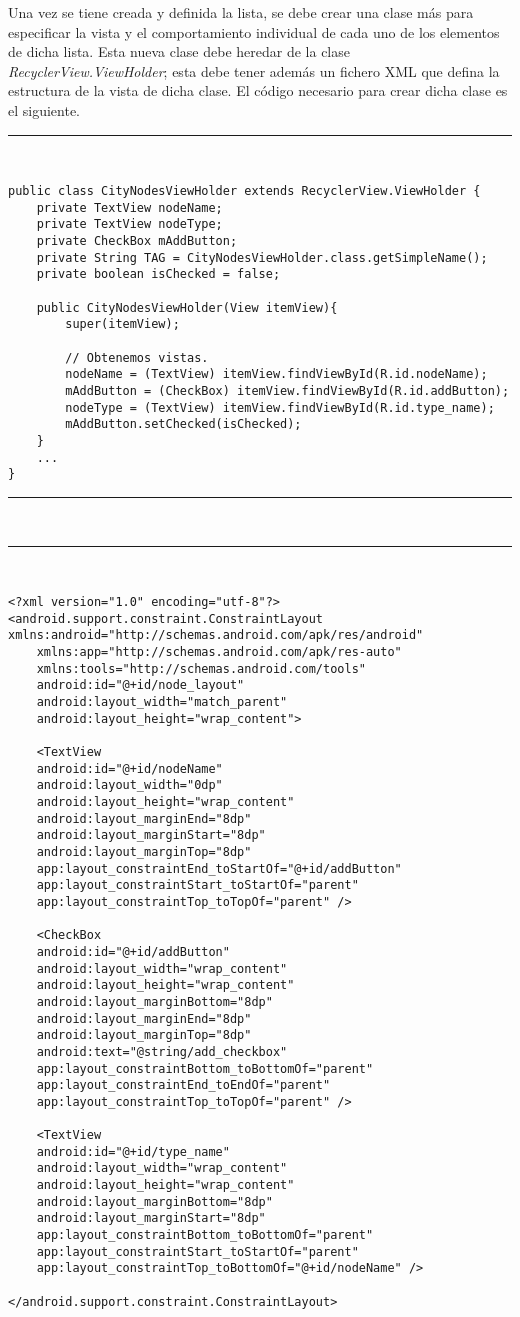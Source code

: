 Una vez se tiene  creada y definida la lista, se debe crear una clase más para especificar la vista y el comportamiento individual de cada uno de los elementos de dicha lista. Esta nueva clase debe heredar de la clase \textit{RecyclerView.ViewHolder}; esta debe tener además un fichero XML que defina la estructura de la vista de dicha clase. El código necesario para crear dicha clase es el siguiente.\newline

\noindent\rule[-1ex]{\textwidth}{1pt}\\
\begin{lstlisting}[caption=Código para crear un elemento de una lista en Android.]
public class CityNodesViewHolder extends RecyclerView.ViewHolder {
	private TextView nodeName;
	private TextView nodeType;
	private CheckBox mAddButton;
	private String TAG = CityNodesViewHolder.class.getSimpleName();
	private boolean isChecked = false;
	
	public CityNodesViewHolder(View itemView){
		super(itemView);
		
		// Obtenemos vistas.
		nodeName = (TextView) itemView.findViewById(R.id.nodeName);
		mAddButton = (CheckBox) itemView.findViewById(R.id.addButton);
		nodeType = (TextView) itemView.findViewById(R.id.type_name);
		mAddButton.setChecked(isChecked);
	}
	...
}
\end{lstlisting}
\noindent\rule[-1ex]{\textwidth}{1pt}\\
\newpage
\noindent\rule[-1ex]{\textwidth}{1pt}\\
\begin{lstlisting}[caption=Código XML de la vista de un elemento de la lista.]
<?xml version="1.0" encoding="utf-8"?>
<android.support.constraint.ConstraintLayout xmlns:android="http://schemas.android.com/apk/res/android"
	xmlns:app="http://schemas.android.com/apk/res-auto"
	xmlns:tools="http://schemas.android.com/tools"
	android:id="@+id/node_layout"
	android:layout_width="match_parent"
	android:layout_height="wrap_content">

	<TextView
	android:id="@+id/nodeName"
	android:layout_width="0dp"
	android:layout_height="wrap_content"
	android:layout_marginEnd="8dp"
	android:layout_marginStart="8dp"
	android:layout_marginTop="8dp"
	app:layout_constraintEnd_toStartOf="@+id/addButton"
	app:layout_constraintStart_toStartOf="parent"
	app:layout_constraintTop_toTopOf="parent" />
	
	<CheckBox
	android:id="@+id/addButton"
	android:layout_width="wrap_content"
	android:layout_height="wrap_content"
	android:layout_marginBottom="8dp"
	android:layout_marginEnd="8dp"
	android:layout_marginTop="8dp"
	android:text="@string/add_checkbox"
	app:layout_constraintBottom_toBottomOf="parent"
	app:layout_constraintEnd_toEndOf="parent"
	app:layout_constraintTop_toTopOf="parent" />
	
	<TextView
	android:id="@+id/type_name"
	android:layout_width="wrap_content"
	android:layout_height="wrap_content"
	android:layout_marginBottom="8dp"
	android:layout_marginStart="8dp"
	app:layout_constraintBottom_toBottomOf="parent"
	app:layout_constraintStart_toStartOf="parent"
	app:layout_constraintTop_toBottomOf="@+id/nodeName" />

</android.support.constraint.ConstraintLayout>
\end{lstlisting}
